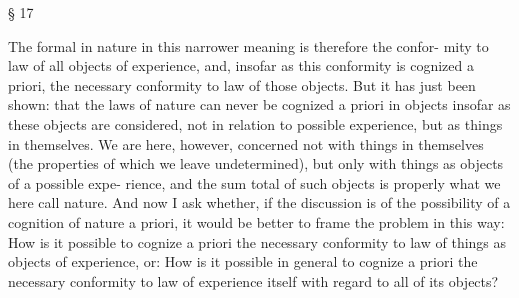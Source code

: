 § 17

The formal in nature in this narrower meaning is therefore the confor-
mity to law of all objects of experience, and, insofar as this conformity
is cognized a priori, the necessary conformity to law of those objects. But
it has just been shown: that the laws of nature can never be cognized a
priori in objects insofar as these objects are considered, not in relation to
possible experience, but as things in themselves. We are here, however,
concerned not with things in themselves (the properties of which we
leave undetermined), but only with things as objects of a possible expe-
rience, and the sum total of such objects is properly what we here call
nature. And now I ask whether, if the discussion is of the possibility of a
cognition of nature a priori, it would be better to frame the problem in
this way: How is it possible to cognize a priori the necessary conformity
to law of things as objects of experience, or: How is it possible in general
to cognize a priori the necessary conformity to law of experience itself with
regard to all of its objects?

